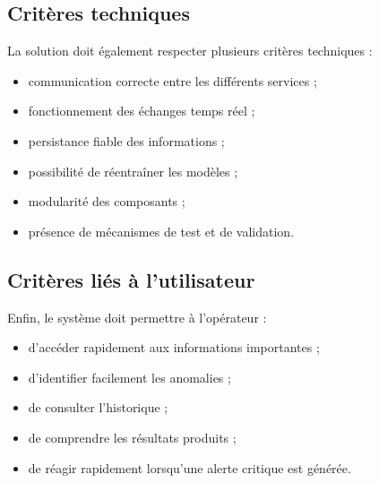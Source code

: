 \subsection{Critères techniques}

La solution doit également respecter plusieurs critères techniques :

\begin{itemize}

    \item communication correcte entre les différents services ;

    \item fonctionnement des échanges temps réel ;

    \item persistance fiable des informations ;

    \item possibilité de réentraîner les modèles ;

    \item modularité des composants ;

    \item présence de mécanismes de test et de validation.

\end{itemize}

\subsection{Critères liés à l'utilisateur}

Enfin, le système doit permettre à l'opérateur :

\begin{itemize}

    \item d'accéder rapidement aux informations importantes ;

    \item d'identifier facilement les anomalies ;

    \item de consulter l'historique ;

    \item de comprendre les résultats produits ;

    \item de réagir rapidement lorsqu'une alerte critique est générée.

\end{itemize}


